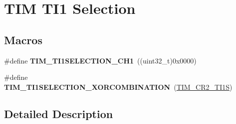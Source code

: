 \hypertarget{group___t_i_m___t_i1___selection}{}\section{T\+IM T\+I1 Selection}
\label{group___t_i_m___t_i1___selection}
\subsection*{Macros}
\begin{DoxyCompactItemize}
\item 
\#define {\bfseries T\+I\+M\+\_\+\+T\+I1\+S\+E\+L\+E\+C\+T\+I\+O\+N\+\_\+\+C\+H1}~((uint32\+\_\+t)0x0000)\hypertarget{group___t_i_m___t_i1___selection_gace6563bccf7635461f660fbed6241488}{}\label{group___t_i_m___t_i1___selection_gace6563bccf7635461f660fbed6241488}

\item 
\#define {\bfseries T\+I\+M\+\_\+\+T\+I1\+S\+E\+L\+E\+C\+T\+I\+O\+N\+\_\+\+X\+O\+R\+C\+O\+M\+B\+I\+N\+A\+T\+I\+ON}~(\hyperlink{group___peripheral___registers___bits___definition_gad07504497b70af628fa1aee8fe7ef63c}{T\+I\+M\+\_\+\+C\+R2\+\_\+\+T\+I1S})\hypertarget{group___t_i_m___t_i1___selection_ga40dfcb0e3f2fdf0f45cbba227106310a}{}\label{group___t_i_m___t_i1___selection_ga40dfcb0e3f2fdf0f45cbba227106310a}

\end{DoxyCompactItemize}


\subsection{Detailed Description}
